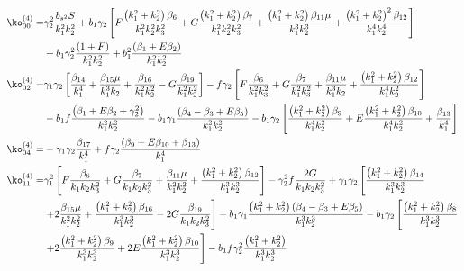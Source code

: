 {\begin{align*}
\ko_{00}^{(4)}=& \gamma_2^2 \frac{b_{s^2} S}{k_1^2 k_2^2} + b_1 \gamma_2 \left[ F \frac{\left(k_1^2 + k_2^2 \right) \beta_{6}}{k_1^2 k_2^2 k_3^2} + G \frac{\left( k_1^2 + k_2^2 \right) \beta_{7}}{k_1^2 k_2^2 k_3^2} + \frac{\left( k_1^2 + k_2^2\right) \beta_{11} \mu }{k_1^3 k_2^3} + \frac{\left(k_1^2 + k_2^2 \right)^2 \beta_{12}}{k_1^4 k_2^4} \right] \\
&+ b_1 \gamma_2^2 \frac{\left( 1 + F \right)}{k_1^2 k_2^2} + b_1^2 \frac{\left( \beta_1 + E \beta_2 \right)}{k_1^2 k_2^2}\\
\ko_{02}^{(4)}=& \gamma_1 \gamma_2 \left[ \frac{\beta_{14}}{k_1^4} + \frac{\beta_{15} \mu}{k_1^3 k_2} + \frac{\beta_{16}}{k_1^2 k_2^2} - G \frac{\beta_{19}}{k_1^2 k_2^2} \right] - f \gamma_2 \left[ F \frac{\beta_{6}}{k_1^2 k_3^2} + G \frac{\beta_{7}}{k_1^2 k_3^2} + \frac{\beta_{11} \mu }{k_1^3 k_2} + \frac{ \left( k_1^2 + k_2^2 \right) \beta_{12}}{k_1^4 k_2^2} \right] \\
&- b_1 f \frac{\left( \beta_1 + E \beta_2 + \gamma_2^2 \right)}{k_1^2 k_2^2} - b_1 \gamma_1 \frac{\left( {\beta_{4}-\beta_{3}} + E \beta_{5} \right)}{k_1^2 k_2^2} - b_1 \gamma_2 \left[ \frac{\left( k_1^2 + k_2^2 \right) \beta_{9}}{k_1^4 k_2^2} + E \frac{\left( k_1^2 + k_2^2\right) \beta_{10} }{k_1^4 k_2^2} + \frac{\beta_{13}}{k_1^4} \right] \\
\ko_{04}^{(4)}=& - \gamma_1 \gamma_2 \frac{\beta_{17}}{k_1^4} + f \gamma_2 \frac{\left( \beta_{9} + E \beta_{10} + \beta_{13} \right)}{k_1^4}\\
\ko_{11}^{(4)}=& \gamma_1^2 \left[ F \frac{\beta_{6}}{k_1 k_2 k_3^2} + G \frac{\beta_{7}}{k_1 k_2 k_3^2} + \frac{\beta_{11} \mu}{k_1^2 k_2^2} + \frac{\left( k_1^2 + k_2^2\right) \beta_{12}}{k_1^3 k_2^3} \right] - \gamma_2^2 f \frac{2 G}{k_1 k_2 k_3^2} + \gamma_1 \gamma_2 \left[ \frac{\left( k_1^2 + k_2^2 \right) \beta_{14}}{k_1^3 k_2^3} \right. \\
&\left. + 2 \frac{\beta_{15} \mu}{k_1^2 k_2^2} + \frac{\left( k_1^2 + k_2^2 \right) \beta_{16}}{k_1^3 k_2^3} - 2 G \frac{\beta_{19}}{k_1 k_2 k_3^2} \right] - b_1 \gamma_1 \frac{\left( k_1^2 + k_2^2\right) \left( {\beta_{4}-\beta_{3}} + E \beta_{5} \right)}{k_1^3 k_2^3} - b_1 \gamma_2 \left[ \frac{\left( k_1^2 + k_2^2 \right) \beta_{8}}{k_1^3 k_2^3} \right. \\
&\left. + 2 \frac{\left( k_1^2 + k_2^2 \right) \beta_{9}}{k_1^3 k_2^3} + 2 E \frac{\left(k_1^2 + k_2^2 \right) \beta_{10}}{k_1^3 k_2^3} \right] - b_1 f \gamma_2^2 \frac{\left( k_1^2 + k_2^2 \right)}{k_1^3 k_2^3 } \\

\end{align*}}
